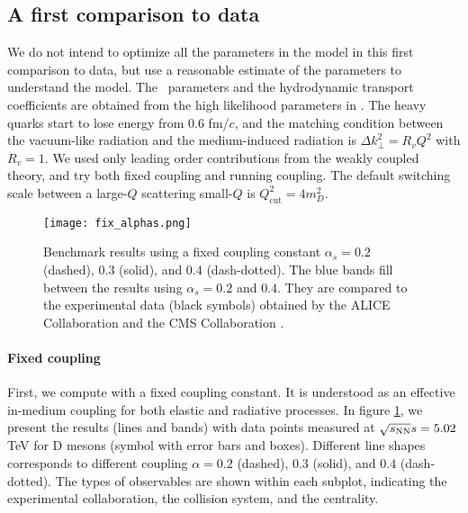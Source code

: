 \subsection{A first comparison to data}
We do not intend to optimize all the parameters in the model in this first comparison to data, but use a reasonable estimate of the parameters to understand the model.
The \trento\ parameters and the hydrodynamic transport coefficients are obtained from the high likelihood parameters in \cite{Bernhard:2018hnz}.
The heavy quarks start to lose energy from $0.6$ fm/$c$, and the matching condition between the vacuum-like radiation and the medium-induced radiation is $\Delta k_\perp^2 = R_v Q^2$ with $R_v = 1$.
We used only leading order contributions from the weakly coupled theory, and try both fixed coupling and running coupling.
The default switching scale between a large-$Q$ scattering small-$Q$ is $Q_{\textrm{cut}}^2 = 4 m_D^2$.

\begin{figure}
\singlespacing
\centering
\texttt{[image: fix\_alphas.png]}
\caption[Benchmark results using a fixed coupling constant $\alpha_s = 0.2$ (dashed),]{Benchmark results using a fixed coupling constant $\alpha_s = 0.2$ (dashed), $0.3$ (solid), and $0.4$ (dash-dotted). The blue bands fill between the results using $\alpha_s=0.2$ and $0.4$. They are compared to the experimental data (black symbols) obtained by the ALICE Collaboration \cite{Acharya:2017qps,Acharya:2018hre} and the CMS Collaboration \cite{Sirunyan:2017xss,Sirunyan:2017plt}.}
\label{fig:new:fix-a}
\end{figure}

\paragraph{Fixed coupling} First, we compute with a fixed coupling constant.
It is understood as an effective in-medium coupling for both elastic and radiative processes.
In figure \ref{fig:new:fix-a}, we present the results (lines and bands) with data points measured at $\sqrt{s_\mathrm{NN}}{s} = 5.02$ TeV for D mesons (symbol with error bars and boxes).
Different line shapes corresponds to different coupling $\alpha=0.2$ (dashed), $0.3$ (solid), and $0.4$ (dash-dotted). 
The types of observables are shown within each subplot, indicating the experimental collaboration, the collision system, and the centrality.

